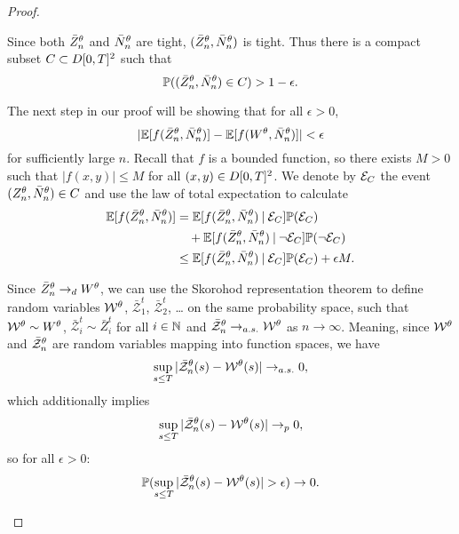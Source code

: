 \begin{proof}
\begin{proofpart}
Since both $\bar{Z}^{\theta}_n$ and $\bar{N}_n^{\theta}$ are tight, $(\bar{Z}^{\theta}_n, \bar{N}_n^{\theta})$ is tight.
Thus there is a compact subset $C \subset D[0, T]^2$ such that
\begin{equation}
	\mathbb{P}( (\bar{Z}^{\theta}_n, \bar{N}_n^{\theta}) \in C) > 1 - \epsilon.
\end{equation}
\end{proofpart}



\begin{proofpart}
The next step in our proof will be showing that for all $\epsilon > 0$,
\begin{equation}
|\mathbb{E}[ f(\bar{Z}^{\theta}_n, \bar{N}_n^{\theta})] - \mathbb{E}[f(W^{\theta}, \bar{N}_n^{\theta})]| < \epsilon
\end{equation}
for sufficiently large $n$.
Recall that $f$ is a bounded function, so there exists $M>0$ such that $|f(x,y)| \leq M$ for all $(x,y) \in D[0, T]^2$.
We denote by $\mathcal{E}_{C}$ the event $(Z_n^{\theta}, \bar{N}_n^{\theta}) \in C$ and use the law of total expectation to calculate
\begin{equation} \label{E: Estimation step 1}
\begin{aligned}
\mathbb{E}[ f(\bar{Z}^{\theta}_n, \bar{N}_n^{\theta})] 
&= \mathbb{E}[f(\bar{Z}^{\theta}_n, \bar{N}_n^{\theta}) \: | \: \mathcal{E}_{C}] \mathbb{P}(\mathcal{E}_{C}) \\
&\quad + \mathbb{E}[f(\bar{Z}^{\theta}_n, \bar{N}_n^{\theta}) \: | \: \neg\mathcal{E}_{C}] \mathbb{P}(\neg\mathcal{E}_{C}) \\
&\leq \mathbb{E}[f(\bar{Z}^{\theta}_n, \bar{N}_n^{\theta}) \: | \: \mathcal{E}_{C}]\mathbb{P}(\mathcal{E}_{C}) + \epsilon M.
\end{aligned}
\end{equation}

Since $\bar{Z}^{\theta}_n \rightarrow_d W^{\theta}$, we can use the Skorohod representation theorem to define random variables 
$\mathcal{W}^{\theta}$, $\bar{\mathcal{Z}}^t_1$, $\bar{\mathcal{Z}}^t_2$, \dots
on the same probability space, such that $\mathcal{W}^{\theta} \sim W^{\theta}$, $\bar{\mathcal{Z}}^t_i \sim \bar{Z}^t_i$ for all $i \in \mathbb{N}$
and $\bar{\mathcal{Z}}^{\theta}_n \rightarrow_{a.s.} \mathcal{W}^{\theta}$ as $n \rightarrow \infty$.
Meaning, since $\mathcal{W}^{\theta}$ and $\bar{\mathcal{Z}}^{\theta}_n$ are random variables mapping into function spaces, we have
\begin{equation}
\sup_{s \leq T} |\bar{\mathcal{Z}}^{\theta}_n(s) - \mathcal{W}^{\theta}(s)| \rightarrow_{a.s.} 0,
\end{equation}
which additionally implies
\begin{equation} 
\sup_{s \leq T} |\bar{\mathcal{Z}}^{\theta}_n(s) - \mathcal{W}^{\theta}(s)| \rightarrow_p 0,
\end{equation}
so for all $\epsilon > 0$:
\begin{equation} \label{E: Prob(Event(delta)) 1}
\mathbb{P}( \sup_{s \leq T} |\bar{\mathcal{Z}}^{\theta}_n(s) - \mathcal{W}^{\theta}(s)| > \epsilon ) \rightarrow 0.
\end{equation}


\end{proofpart}
\end{proof}
